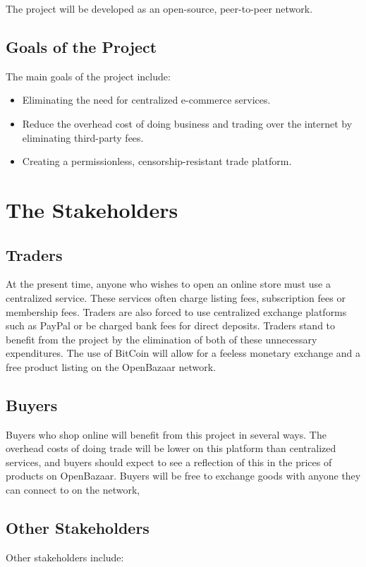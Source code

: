 \documentclass{article}
\begin{document}
The project will be developed as an open-source, peer-to-peer network. 


\subsection{Goals of the Project}
The main goals of the project include:

\begin{itemize}
\item
Eliminating the need for centralized e-commerce services.

\item
Reduce the overhead cost of doing business and trading over the internet by eliminating third-party fees.

\item
Creating a permissionless, censorship-resistant trade platform.
\end{itemize}

\section{The Stakeholders}

\subsection{Traders}
At the present time, anyone who wishes to open an online store must use a centralized service. These services often charge listing fees, subscription fees or membership fees. Traders are also forced to use centralized exchange platforms such as PayPal or be charged bank fees for direct deposits. Traders stand to benefit from the project by the elimination of both of these unnecessary expenditures. The use of BitCoin will allow for a feeless monetary exchange and a free product listing on the OpenBazaar network.

\subsection{Buyers}
Buyers who shop online will benefit from this project in several ways. The overhead costs of doing trade will be lower on this platform than centralized services, and buyers should expect to see a reflection of this in the prices of products on OpenBazaar. Buyers will be free to exchange goods with anyone they can connect to on the network, 

\subsection{Other Stakeholders}
Other stakeholders include:
\end{document}
